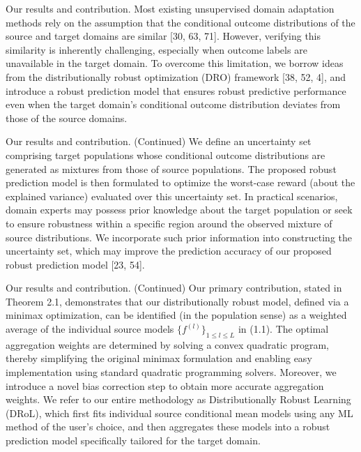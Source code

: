 \documentclass{beamer}
\begin{document}
\begin{frame}{Our results and contribution.}
    Most existing unsupervised domain adaptation methods rely on the assumption that the conditional outcome distributions of the source and target domains are similar [30, 63, 71]. However, verifying this similarity is inherently challenging, especially when outcome labels are unavailable in the target domain. To overcome this limitation, we borrow ideas from the distributionally robust optimization (DRO) framework [38, 52, 4], and introduce a robust prediction model that ensures robust predictive performance even when the target domain’s conditional outcome distribution deviates from those of the source domains.
\end{frame}

\begin{frame}{Our results and contribution. (Continued)}
    We define an uncertainty set comprising target populations whose conditional outcome distributions are generated as mixtures from those of source populations. The proposed robust prediction model is then formulated to optimize the worst-case reward (about the explained variance) evaluated over this uncertainty set. In practical scenarios, domain experts may possess prior knowledge about the target population or seek to ensure robustness within a specific region around the observed mixture of source distributions. We incorporate such prior information into constructing the uncertainty set, which may improve the prediction accuracy of our proposed robust prediction model [23, 54].
\end{frame}

\begin{frame}{Our results and contribution. (Continued)}
    Our primary contribution, stated in Theorem 2.1, demonstrates that our distributionally robust model, defined via a minimax optimization, can be identified (in the population sense) as a weighted average of the individual source models $\{ f ^ { ( l ) } \} _ { 1 \le l \le L }$ in (1.1). The optimal aggregation weights are determined by solving a convex quadratic program, thereby simplifying the original minimax formulation and enabling easy implementation using standard quadratic programming solvers. Moreover, we introduce a novel bias correction step to obtain more accurate aggregation weights. We refer to our entire methodology as Distributionally Robust Learning (DRoL), which first fits individual source conditional mean models using any ML method of the user’s choice, and then aggregates these models into a robust prediction model specifically tailored for the target domain.
\end{frame}
\end{document}
